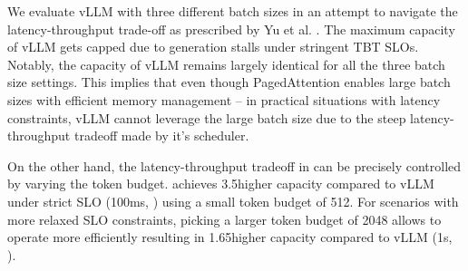 We evaluate vLLM with three different batch sizes in an attempt to navigate the latency-throughput trade-off as prescribed by Yu et al. \cite{orca}. The maximum capacity of vLLM gets capped due to generation stalls under stringent TBT SLOs. Notably, the capacity of vLLM remains largely identical for all the three batch size settings. This implies that even though PagedAttention enables large batch sizes with efficient memory management -- in practical situations with latency constraints, vLLM cannot leverage the large batch size due to the steep latency-throughput tradeoff made by it's \prefillprio scheduler.

On the other hand, the latency-throughput tradeoff in \sysname can be precisely controlled by varying the token budget. \sysname achieves 3.5\myx higher capacity compared to vLLM under strict SLO (100ms, \mistral) using a small token budget of 512. For scenarios with more relaxed SLO constraints, picking a larger token budget of 2048 allows \sysname to operate more efficiently resulting in 1.65\myx higher capacity compared to vLLM (1s, \yi).








